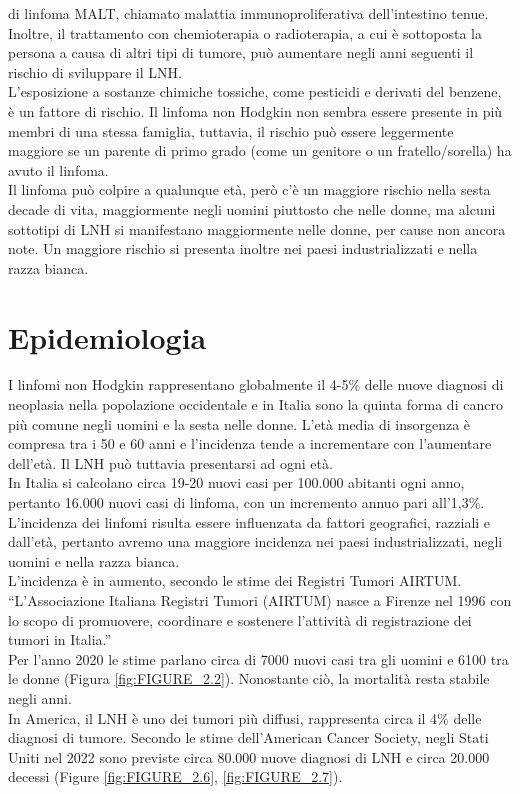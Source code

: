 di linfoma MALT, chiamato malattia immunoproliferativa dell'intestino tenue\cite{AMERICANCS}.\\
Inoltre, il trattamento con chemioterapia o radioterapia, a cui è sottoposta la persona a causa di altri tipi di tumore, 
può aumentare negli anni seguenti  il rischio di sviluppare il LNH\cite{AMERICANCS}.\\
L’esposizione a sostanze chimiche tossiche, come pesticidi e derivati del benzene, è un fattore di rischio. 
Il linfoma non Hodgkin non sembra essere presente in più membri di una stessa famiglia, tuttavia, 
il rischio può essere leggermente maggiore se un parente di primo grado (come un genitore o un fratello/sorella) 
ha avuto il linfoma\cite{AMERICANCS}.\\
Il linfoma può colpire a qualunque età, però c’è un maggiore rischio nella sesta decade di vita, 
maggiormente negli uomini piuttosto che nelle donne, ma alcuni sottotipi di LNH si manifestano 
maggiormente nelle donne, per cause non ancora note. 
Un maggiore rischio si presenta inoltre nei paesi industrializzati e nella razza bianca\cite{AMERICANCS}.\\ 

\section{Epidemiologia}
I linfomi non Hodgkin rappresentano globalmente il 4-5\% delle nuove diagnosi di neoplasia nella popolazione 
occidentale e in Italia 
sono la quinta forma di cancro più comune negli uomini e la sesta nelle donne\cite{AIOM}. 
L’età media di insorgenza è compresa tra i 50 e 60 anni e l’incidenza tende a incrementare con l’aumentare dell’età. 
Il LNH può tuttavia presentarsi ad ogni età.\\ 
In Italia si calcolano circa 19-20 nuovi casi per 100.000 abitanti ogni anno, pertanto 16.000 nuovi casi di linfoma, 
con un incremento annuo pari all’1,3\%\cite{AIOM}.\\
L’incidenza dei linfomi risulta essere influenzata da fattori geografici, razziali e dall'età, 
pertanto avremo una maggiore incidenza nei paesi industrializzati, negli uomini e nella razza bianca\cite{AIOM}.\\
L’incidenza è in aumento, secondo le stime dei Registri Tumori AIRTUM. “L’Associazione Italiana Registri Tumori 
(AIRTUM) nasce a Firenze nel 1996 con lo scopo di promuovere, coordinare e sostenere l’attività di registrazione 
dei tumori in Italia\cite{AIRTUM}.”\\
Per l’anno 2020 le stime parlano circa di 7000 nuovi casi tra gli uomini e 6100 tra le donne (Figura \ref{fig:FIGURE_2.2}). 
Nonostante ciò, la mortalità resta stabile negli anni\cite{AIRC}.\\
In America, il LNH è uno dei tumori più diffusi, rappresenta circa il 4\% delle diagnosi di tumore. 
Secondo le stime dell’American Cancer Society, negli Stati Uniti nel 2022 sono previste circa 80.000 nuove 
diagnosi di LNH e circa 20.000 decessi (Figure \ref{fig:FIGURE_2.6}, \ref{fig:FIGURE_2.7})\cite{Americanstatistic}.\\

